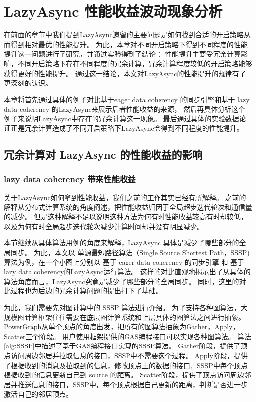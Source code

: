 

\chapter{LazyAsync 性能收益波动现象分析}
在前面的章节中我们提到LazyAsync遗留的主要问题是如何找到合适的开启策略从而得到相对最优的性能提升。
为此，本章对不同开启策略下得到不同程度的性能提升这一问题进行了研究，并通过实验得到了结论：
性能提升主要受冗余计算影响，不同开启策略下存在不同程度的冗余计算，冗余计算程度较低的开启策略能够获得更好的性能提升。
通过这一结论，本文对LazyAsync的性能提升的规律有了更深刻的认识。

本章将首先通过具体的例子对比基于eager data coherency 的同步引擎和基于 lazy data coherency 的LazyAsync来展示后者性能收益的来源，
然后再具体分析这个例子来说明LazyAsync中存在的冗余计算这一现象。
最后通过具体的实验数据论证正是冗余计算造成了不同开启策略下LazyAsync会得到不同程度的性能提升。



\section{冗余计算对 LazyAsync 的性能收益的影响}
\subsection{lazy data coherency 带来性能收益}
关于LazyAsync如何拿到性能收益，我们之前的工作其实已经有所解释。
之前的解释从分布式计算系统的角度阐述，把性能收益归因于全局超步迭代轮次和通信量的减少。
但是这种解释不足以说明这种方法为何有时性能收益较高有时却较低，以及为何有时全局超步迭代轮次减少计算时间却并没有明显减少。


本节继续从具体算法用例的角度来解释，LazyAsync 具体是减少了哪些部分的全局同步。
为此，本文以 单源最短路径算法（Single Source Shortest Path，SSSP)算法为例，在一个小图上分别以 基于 eager data coherency 的同步引擎
和 基于lazy data coherency的LazyAsync运行算法。
这样的对比直观地揭示出了从具体的算法角度而言，LazyAsync究竟是减少了哪些部分的全局同步。
同时，这里的对比过程也为后边的冗余计算问题的提出打下了基础。


为此，我们需要先对图计算中的 SSSP 算法进行介绍。
为了支持各种图算法，大规模图计算框架往往需要在底层图计算系统和上层具体的图算法之间进行抽象。
PowerGraph从单个顶点的角度出发\cite{McCune@CS15}，把所有的图算法抽象为Gather，Apply，Scatter三个阶段。
用户使用框架提供的GAS编程接口可以实现各种图算法。
算法\ref{alg:SSSP}中描述了基于GAS编程接口实现的SSSP算法。
Gather阶段，提供了顶点访问周边邻居并拉取信息的接口，SSSP中不需要这个过程。
Apply阶段，提供了根据收到的消息及拉取到的信息，修改顶点上的数据的接口，SSSP中每个顶点根据收到的信息更新自己到 source 的距离。
Scatter阶段，提供了顶点访问周边邻居并推送信息的接口，SSSP中，每个顶点根据自己更新的距离，判断是否进一步激活自己的邻居顶点。

